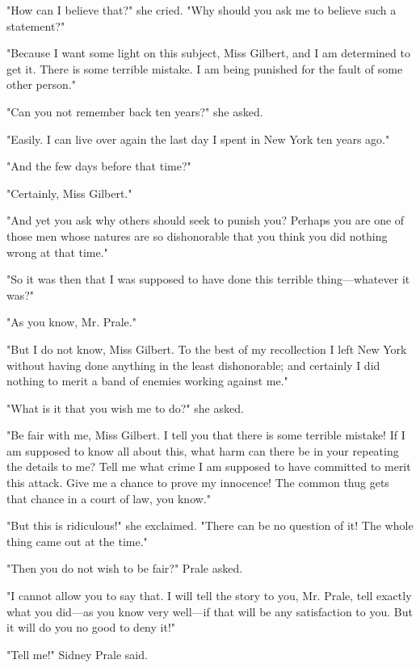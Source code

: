 \documentclass{novel}
\begin{document}
"How can I believe that?" she cried. "Why should you ask me to believe such a statement?"

"Because I want some light on this subject, Miss Gilbert, and I am determined to get it. There is some terrible mistake. I am being punished for the fault of some other person."

"Can you not remember back ten years?" she asked.

"Easily. I can live over again the last day I spent in New York ten years ago."

"And the few days before that time?"

"Certainly, Miss Gilbert."

"And yet you ask why others should seek to punish you? Perhaps you are one of those men whose natures are so dishonorable that you think you did nothing wrong at that time."

"So it was then that I was supposed to have done this terrible thing---whatever it was?"

"As you know, Mr. Prale."

"But I do not know, Miss Gilbert. To the best of my recollection I left New York without having done anything in the least dishonorable; and certainly I did nothing to merit a band of enemies working against me."

"What is it that you wish me to do?" she asked.

"Be fair with me, Miss Gilbert. I tell you that there is some terrible mistake! If I am supposed to know all about this, what harm can there be in your repeating the details to me? Tell me what crime I am supposed to have committed to merit this attack. Give me a chance to prove my innocence! The common thug gets that chance in a court of law, you know."

"But this is ridiculous!" she exclaimed. "There can be no question of it! The whole thing came out at the time."

"Then you do not wish to be fair?" Prale asked.

"I cannot allow you to say that. I will tell the story to you, Mr. Prale, tell exactly what you did---as you know very well---if that will be any satisfaction to you. But it will do you no good to deny it!"

"Tell me!" Sidney Prale said.

\vspace{2\nbs}
\clearpage
\thispagestyle{empty}

\begin{ChapterStart}
\vspace{3\nbs}
\end{ChapterStart}
    
\end{document}
